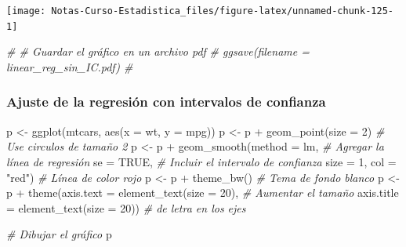 \documentclass[
  12pt,
]{book}
\newenvironment{Shaded}{\begin{snugshade}}{\end{snugshade}}
\newcommand{\AttributeTok}[1]{\textcolor[rgb]{0.77,0.63,0.00}{#1}}
\newcommand{\CommentTok}[1]{\textcolor[rgb]{0.56,0.35,0.01}{\textit{#1}}}
\newcommand{\ConstantTok}[1]{\textcolor[rgb]{0.00,0.00,0.00}{#1}}
\newcommand{\DecValTok}[1]{\textcolor[rgb]{0.00,0.00,0.81}{#1}}
\newcommand{\FunctionTok}[1]{\textcolor[rgb]{0.00,0.00,0.00}{#1}}
\newcommand{\NormalTok}[1]{#1}
\newcommand{\OtherTok}[1]{\textcolor[rgb]{0.56,0.35,0.01}{#1}}
\newcommand{\SpecialCharTok}[1]{\textcolor[rgb]{0.00,0.00,0.00}{#1}}
\newcommand{\StringTok}[1]{\textcolor[rgb]{0.31,0.60,0.02}{#1}}
\begin{document}
\begin{center}\texttt{[image: Notas-Curso-Estadistica\_files/figure-latex/unnamed-chunk-125-1]} \end{center}

\begin{Shaded}
\begin{Highlighting}[]
\CommentTok{\# \# Guardar el gráfico en un archivo pdf}
\CommentTok{\# ggsave(filename = \textquotesingle{}linear\_reg\_sin\_IC.pdf\textquotesingle{}) \# }
\end{Highlighting}
\end{Shaded}

\hypertarget{ajuste-de-la-regresiuxf3n-con-intervalos-de-confianza}{%
\subsubsection{Ajuste de la regresión con intervalos de
confianza}\label{ajuste-de-la-regresiuxf3n-con-intervalos-de-confianza}}

\begin{Shaded}
\begin{Highlighting}[]
\NormalTok{p }\OtherTok{\textless{}{-}} \FunctionTok{ggplot}\NormalTok{(mtcars, }\FunctionTok{aes}\NormalTok{(}\AttributeTok{x =}\NormalTok{ wt, }\AttributeTok{y =}\NormalTok{ mpg)) }
\NormalTok{p }\OtherTok{\textless{}{-}}\NormalTok{ p }\SpecialCharTok{+} \FunctionTok{geom\_point}\NormalTok{(}\AttributeTok{size =} \DecValTok{2}\NormalTok{)       }\CommentTok{\# Use circulos de tamaño 2}
\NormalTok{p }\OtherTok{\textless{}{-}}\NormalTok{ p }\SpecialCharTok{+} \FunctionTok{geom\_smooth}\NormalTok{(}\AttributeTok{method =}\NormalTok{ lm,   }\CommentTok{\# Agregar la línea de regresión }
              \AttributeTok{se =} \ConstantTok{TRUE}\NormalTok{,            }\CommentTok{\# Incluir el intervalo de confianza   }
              \AttributeTok{size =} \DecValTok{1}\NormalTok{,}
              \AttributeTok{col =} \StringTok{"red"}\NormalTok{)          }\CommentTok{\# Línea de color rojo }
\NormalTok{p }\OtherTok{\textless{}{-}}\NormalTok{ p }\SpecialCharTok{+} \FunctionTok{theme\_bw}\NormalTok{()                 }\CommentTok{\# Tema de fondo blanco}
\NormalTok{p }\OtherTok{\textless{}{-}}\NormalTok{ p }\SpecialCharTok{+} \FunctionTok{theme}\NormalTok{(}\AttributeTok{axis.text =} \FunctionTok{element\_text}\NormalTok{(}\AttributeTok{size =} \DecValTok{20}\NormalTok{),  }\CommentTok{\# Aumentar el tamaño }
               \AttributeTok{axis.title =} \FunctionTok{element\_text}\NormalTok{(}\AttributeTok{size =} \DecValTok{20}\NormalTok{)) }\CommentTok{\# de letra en los ejes}

\CommentTok{\# Dibujar el gráfico}
\NormalTok{p   }
\end{Highlighting}
\end{Shaded}
\end{document}
